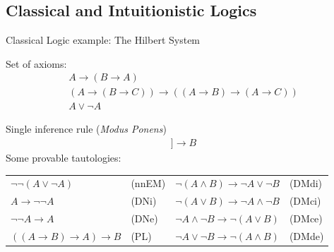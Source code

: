 \documentclass[aspectratio=169, fleqn]{beamer}
\begin{document}
\subsection{Classical and Intuitionistic Logics}

\begin{frame}{Classical Logic}
{example: The Hilbert System}

\textcolor{dkblue}{Set of axioms:}
\begin{gather}
A \rightarrow (B \rightarrow A)
\tag{A1} \\
(A \rightarrow (B \rightarrow C)) \rightarrow ((A \rightarrow B) \rightarrow (A \rightarrow C))
\tag{A2} \\
A \lor \neg A
\tag{EM} 
\end{gather}

\textcolor{dkblue}{Single inference rule (\textit{Modus Ponens})}
\begin{gather} 
[\![ A, A \rightarrow B ]\!] \longrightarrow B
\tag{MP}
\end{gather}
\textcolor{dkblue}{Some provable tautologies:}

\begin{tabular}{p{.32\linewidth}p{.2\linewidth} p{.3\linewidth}p{.25\linewidth}}
$\neg \neg (A \lor \neg A)$ & (nnEM) & $\neg (A \land B) \rightarrow \neg A \lor \neg B $ & (DMdi) \\
$A \rightarrow \neg \neg A$ & (DNi)  & $\neg (A \lor B) \rightarrow \neg A \land \neg B $ & (DMci) \\
$\neg \neg A \rightarrow A$ & (DNe)  & $\neg A \land \neg B \rightarrow  \neg (A \lor B) $ & (DMce) \\
$((A \rightarrow B) \rightarrow A) \rightarrow B$ & (PL) & $\neg A \lor \neg B \rightarrow  \neg (A \land B) $ & (DMde)
\end{tabular}

\end{frame}
\end{document}
